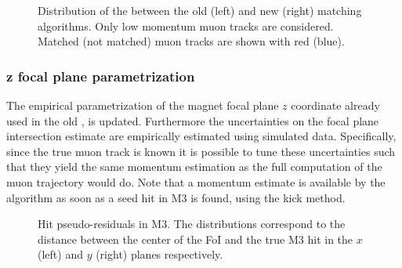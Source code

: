 \begin{figure}[t]
  \centering
  \begin{subfigure}{0.5\textwidth}
    \raggedright
    \scalebox{.55}{}
    \caption{}
    \label{mvm_chi2}
  \end{subfigure}%
  \hfill%
  \begin{subfigure}{0.5\textwidth}
    \raggedleft
    \scalebox{.55}{}
    \caption{}
    \label{mvTTm_chi2}
  \end{subfigure}
  \caption{Distribution of the \chisq between the old (left) and new (right) matching algorithms.
           Only low momentum muon tracks are considered. Matched (not matched) muon tracks are shown with red (blue).}
 \label{mvm_chi2_comp}
\end{figure}

\subsubsection{z focal plane parametrization}
The empirical parametrization of the magnet focal plane $z$ coordinate already used in the old \mvm \cite{roelThesis},
is updated. Furthermore the uncertainties on the focal plane intersection estimate are empirically estimated using simulated data.
Specifically, since the true muon track is known it is possible to tune these uncertainties such that they yield the same momentum
estimation as the full computation of the muon trajectory would do. Note that a momentum estimate is available by the
\mvTTm algorithm as soon as a seed hit in M3 is found, using the kick method.

\begin{figure}[t]
  \centering
  \begin{subfigure}{0.5\textwidth}
    \raggedright
    \scalebox{.55}{}
    \caption{}
    \label{mvTTm_res_x}
  \end{subfigure}%
  \hfill%
  \begin{subfigure}{0.5\textwidth}
    \raggedleft
    \scalebox{.55}{}
    \caption{}
    \label{mvm_res_y}
  \end{subfigure}
  \caption{Hit pseudo-residuals in M3. The distributions correspond to the distance between the center of the FoI and the true M3 hit
           in the $x$ (left) and $y$ (right) planes respectively.}
 \label{mvm_res}
\end{figure}

